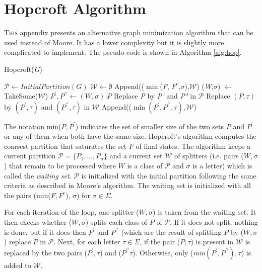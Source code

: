\chapter{Hopcroft Algorithm}\label{cap:hopcroft}


{\lettrine[loversize=0.25,findent=0.2em,nindent=0em]{T}{his } appendix presents an alternative graph minimization algorithm that can be used instead of Moore. It has a lower complexity but it is slightly more complicated to implement. The pseudo-code is shown in Algorithm \ref{alg:hop}. 

\begin{algorithm} 
  \caption{Hopcroft(\textit{G})\label{alg:hop}}
    \begin{algorithmic}[1]
      \State $\mathcal{P} \leftarrow InitialPartition(G)$
      \State $\mathcal{W} \leftarrow \emptyset$
      \ForAll{$\sigma \in \Sigma$}
      	\State Append(($\min$(\textit{F}, $F^c$,$\sigma$),$\mathcal{W}$)
      		\State (\textit{W},$\sigma$) $\leftarrow$ TakeSome($\mathcal{W}$)
				\State $P^{\prime}, P^{\prime\prime} \leftarrow (W,\sigma)|P$      		
				Replace \textit{P} by \textit{P'} and \textit{P"} in $\mathcal{P}$
				\ForAll{$\tau \in \Sigma$}
						\State Replace $(P,\tau)$ by $(P^{\prime},\tau)$ and $(P^{\prime\prime},\tau)$ in $\mathcal{W}$
					\Else
						\State Append(($\min(P^{\prime}, P^{\prime\prime},\tau),\mathcal{W}$)				
					\EndIf				
				\EndFor 
      		\EndFor
      	\EndWhile
      \EndFor
    \end{algorithmic}
  \end{algorithm}

The notation min($P,P^{\prime}$) indicates the set of smaller size of the two sets $P$ and $P^{\prime}$ or any of them when both have the same size. Hopcroft's algorithm computes the coarsest partition that saturates the set $F$ of final states. The algorithm keeps a current partition $\mathcal{P} = \{P_1, \ldots, P_n\}$ and a current set $\mathcal{W}$ of splitters (i.e. pairs ($W, \sigma$) that remain to be processed where $W$ is a class of $\mathcal{P}$ and $\sigma$ is a letter) which is called the \textit{waiting set}. $\mathcal{P}$ is initialized with the initial partition following the same criteria as described in Moore's algorithm. The waiting set is initialized with all the pairs (min($F, F^c$), $\sigma$) for $\sigma\in\Sigma$.

For each iteration of the loop, one splitter ($W,\sigma$) is taken from the waiting set. It then checks whether ($W, \sigma$) splits each class of $P$ of $\mathcal{P}$. If it does not split, nothing is done, but if it does then $P^{\prime}$ and $P^{\prime\prime}$ (which are the result of splitting \textit{P} by ($W,\sigma$) replace $P$ in $\mathcal{P}$. Next, for each letter $\tau\in\Sigma$, if the pair ($P,\tau$) is present in $\mathcal{W}$ is replaced by the two pairs ($P^{\prime},\tau$) and ($P^{\prime\prime}\tau$). Otherwise, only (\textit{min}$(P^{\prime},P^{\prime\prime}),\tau$) is added to $\mathcal{W}$.

}

